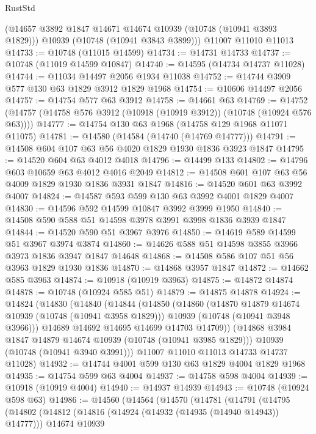 \begin{lexlean}{RustStd}
\begin{coremodule}
      (@14657 @3892 @1847 @14671 @14674 @10939 (@10748 (@10941 @3893 @1829)))
      @10939
      (@10748 (@10941 @3843 @3899)))
    @11007
    @11010
    @11013
@14733 := @10748 (@11015 @14599)
@14734 := @14731 @14733
@14737 := @10748 (@11019 @14599 @10847)
@14740 := @14595 (@14734 @14737 @11028)
@14744 := @11034 @14497 @2056 @1934 @11038
@14752 := @14744 @3909 @577 @130 @63 @1829 @3912 @1829 @1968
@14754 := @10606 @14497 @2056
@14757 := @14754 @577 @63 @3912
@14758 := @14661 @63
@14769 := @14752 (@14757 (@14758 @576 @3912 (@10918 (@10919 @3912)) (@10748 (@10924 @576 @63))))
@14777 := @14754 @130 @63 @1968 (@14758 @129 @1968 @11071 @11075)
@14781 := @14580 (@14584 (@14740 (@14769 @14777)))
@14791 := @14508 @604 @107 @63 @56 @4020 @1829 @1930 @1836 @3923 @1847
@14795 := @14520 @604 @63 @4012 @4018
@14796 := @14499 @133
@14802 := @14796 @603 @10659 @63 @4012 @4016 @2049
@14812 := @14508 @601 @107 @63 @56 @4009 @1829 @1930 @1836 @3931 @1847
@14816 := @14520 @601 @63 @3992 @4007
@14824 := @14587 @593 @599 @130 @63 @3992 @4001 @1829 @4007
@14830 := @14596 @592 @14599 @10847 @3992 @3999 @1950
@14840 := @14508 @590 @588 @51 @14598 @3978 @3991 @3998 @1836 @3939 @1847
@14844 := @14520 @590 @51 @3967 @3976
@14850 := @14619 @589 @14599 @51 @3967 @3974 @3874
@14860 := @14626 @588 @51 @14598 @3855 @3966 @3973 @1836 @3947 @1847 @14648
@14868 := @14508 @586 @107 @51 @56 @3963 @1829 @1930 @1836
@14870 := @14868 @3957 @1847
@14872 := @14662 @585 @3963
@14874 := @10918 (@10919 @3963)
@14875 := @14872 @14874
@14878 := @10748 (@10924 @585 @51)
@14879 := @14875 @14878
@14924 := @14824
    (@14830
      (@14840
        (@14844
          (@14850
            (@14860
              (@14870 @14879 @14674 @10939 (@10748 (@10941 @3958 @1829)))
              @10939
              (@10748 (@10941 @3948 @3966)))
            @14689
            @14692
            @14695
            @14699
            @14703
            @14709))
        (@14868 @3984 @1847 @14879 @14674 @10939 (@10748 (@10941 @3985 @1829)))
        @10939
        (@10748 (@10941 @3940 @3991)))
      @11007
      @11010
      @11013
      @14733
      @14737
      @11028)
@14932 := @14744 @4001 @599 @130 @63 @1829 @4004 @1829 @1968
@14935 := @14754 @599 @63 @4004
@14937 := @14758 @598 @4004
@14939 := @10918 (@10919 @4004)
@14940 := @14937 @14939
@14943 := @10748 (@10924 @598 @63)
@14986 := @14560
    (@14564
      (@14570
        (@14781
          (@14791
            (@14795
              (@14802
                (@14812
                  (@14816 (@14924 (@14932 (@14935 (@14940 @14943)) @14777)))
                  @14674
                  @10939

\end{coremodule}
\end{lexlean}
